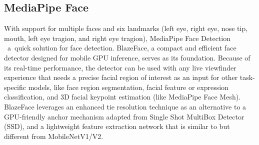 \subsection*{MediaPipe Face}
With support for multiple faces and six landmarks (left eye, right eye, nose tip, mouth, left eye tragion, and right eye tragion), MediaPipe Face Detection  a quick solution for face detection. BlazeFace, a compact and efficient face detector designed for mobile GPU inference, serves as its foundation. Because of its real-time performance, the detector can be used with any live viewfinder experience that needs a precise facial region of interest as an input for other task-specific models, like face region segmentation, facial feature or expression classification, and 3D facial keypoint estimation (like MediaPipe Face Mesh). BlazeFace leverages an enhanced tie resolution technique as an alternative to a GPU-friendly anchor mechanism adapted from Single Shot MultiBox Detector (SSD), and a lightweight feature extraction network that is similar to but different from MobileNetV1/V2. 


